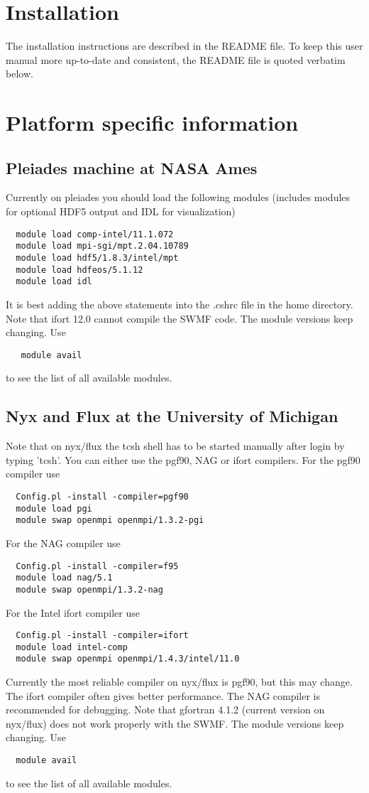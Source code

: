 \section{Installation}

The installation instructions are described in the README file.
To keep this user manual more up-to-date and consistent, 
the README file is quoted verbatim below.



\section{Platform specific information}

\subsection{Pleiades machine at NASA Ames}

Currently on pleiades you should load the following modules
(includes modules for optional HDF5 output and IDL for visualization)
\begin{verbatim}
  module load comp-intel/11.1.072
  module load mpi-sgi/mpt.2.04.10789
  module load hdf5/1.8.3/intel/mpt
  module load hdfeos/5.1.12
  module load idl
\end{verbatim}
It is best adding the above statements into the .cshrc file in the 
home directory. 
Note that ifort 12.0 cannot compile the SWMF code.
The module versions keep changing. Use
\begin{verbatim}
   module avail
\end{verbatim}
to see the list of all available modules.

\subsection{Nyx and Flux at the University of Michigan}

Note that on nyx/flux the tcsh shell has to be started manually after login
by typing 'tcsh'. You can either use the pgf90, NAG or ifort compilers. 
For the pgf90 compiler use
\begin{verbatim}
  Config.pl -install -compiler=pgf90
  module load pgi
  module swap openmpi openmpi/1.3.2-pgi
\end{verbatim}
For the NAG compiler use
\begin{verbatim}
  Config.pl -install -compiler=f95
  module load nag/5.1
  module swap openmpi/1.3.2-nag
\end{verbatim}
For the Intel ifort compiler use
\begin{verbatim}
  Config.pl -install -compiler=ifort
  module load intel-comp
  module swap openmpi openmpi/1.4.3/intel/11.0
\end{verbatim}
Currently the most reliable compiler on nyx/flux is pgf90, 
but this may change. The ifort compiler often gives better performance.
The NAG compiler is recommended for debugging.
Note that gfortran 4.1.2 (current version on nyx/flux) 
does not work properly with the SWMF.
The module versions keep changing. Use
\begin{verbatim}
  module avail
\end{verbatim}
to see the list of all available modules.

